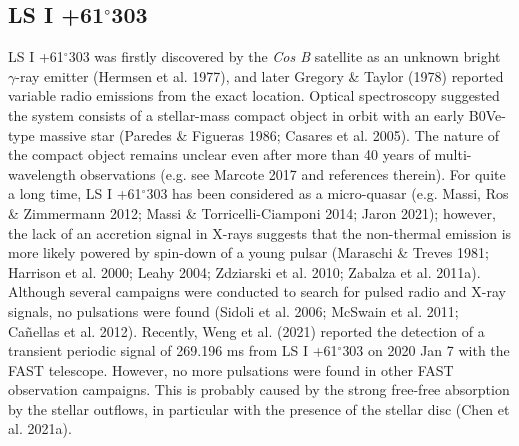 \documentclass{aa}
\def\LSI61{LS I +61$^{\circ}$303}
\begin{document}





\subsection{\LSI61}

\LSI61 was firstly discovered by the \textit{Cos B} satellite as an unknown bright $\gamma$-ray emitter (Hermsen et al. 1977), and later Gregory \& Taylor (1978) reported variable radio emissions from the exact location.
Optical spectroscopy suggested the system consists of a stellar-mass compact object in orbit with an early B0Ve-type massive star (Paredes \& Figueras 1986; Casares et al. 2005).
The nature of the compact object remains unclear even after more than 40 years of multi-wavelength observations (e.g. see Marcote 2017 and references therein).
For quite a long time, \LSI61 has been considered as a micro-quasar (e.g. Massi, Ros \& Zimmermann 2012; Massi \& Torricelli-Ciamponi 2014; Jaron 2021); however, the lack of an accretion signal in X-rays suggests that the non-thermal emission is more likely powered by spin-down of a young pulsar (Maraschi \& Treves 1981; Harrison et al. 2000; Leahy 2004; Zdziarski et al. 2010; Zabalza et al. 2011a).
Although several campaigns were conducted to search for pulsed radio and X-ray signals, no pulsations were found (Sidoli et al. 2006; McSwain et al. 2011; Ca\~nellas et al. 2012).
Recently, Weng et al. (2021) reported the detection of a transient periodic signal of 269.196 ms from \LSI61 on 2020 Jan 7 with the FAST telescope. However, no more pulsations were found in other FAST observation campaigns. This is probably caused by the strong free-free absorption by the stellar outflows, in particular with the presence of the stellar disc (Chen et al. 2021a).
\end{document}
